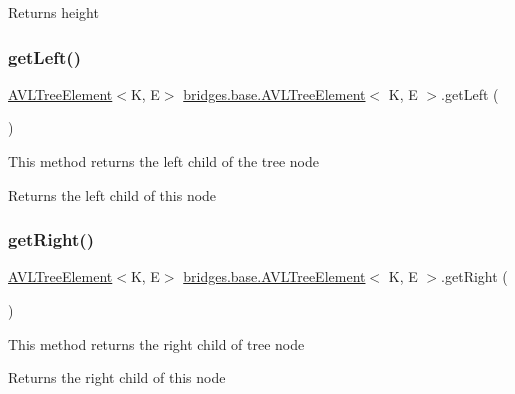 \begin{DoxyReturn}{Returns}
height 
\end{DoxyReturn}
\mbox{\label{classbridges_1_1base_1_1_a_v_l_tree_element_a86f1329b19d2886ba7bf713e3844ecd6}} 
\subsubsection{\texorpdfstring{get\+Left()}{getLeft()}}
{\footnotesize\ttfamily \hyperlink{classbridges_1_1base_1_1_a_v_l_tree_element}{A\+V\+L\+Tree\+Element}$<$K, E$>$ \hyperlink{classbridges_1_1base_1_1_a_v_l_tree_element}{bridges.\+base.\+A\+V\+L\+Tree\+Element}$<$ K, E $>$.get\+Left (\begin{DoxyParamCaption}{ }\end{DoxyParamCaption})}

This method returns the left child of the tree node

\begin{DoxyReturn}{Returns}
the left child of this node 
\end{DoxyReturn}
\mbox{\label{classbridges_1_1base_1_1_a_v_l_tree_element_aab93418ac19605f2c7c57aa38d110921}} 
\subsubsection{\texorpdfstring{get\+Right()}{getRight()}}
{\footnotesize\ttfamily \hyperlink{classbridges_1_1base_1_1_a_v_l_tree_element}{A\+V\+L\+Tree\+Element}$<$K, E$>$ \hyperlink{classbridges_1_1base_1_1_a_v_l_tree_element}{bridges.\+base.\+A\+V\+L\+Tree\+Element}$<$ K, E $>$.get\+Right (\begin{DoxyParamCaption}{ }\end{DoxyParamCaption})}

This method returns the right child of tree node

\begin{DoxyReturn}{Returns}
the right child of this node 
\end{DoxyReturn}
\mbox{\label{classbridges_1_1base_1_1_a_v_l_tree_element_a0dc3c83e750cc39535afb08ea92f6c98}} 
